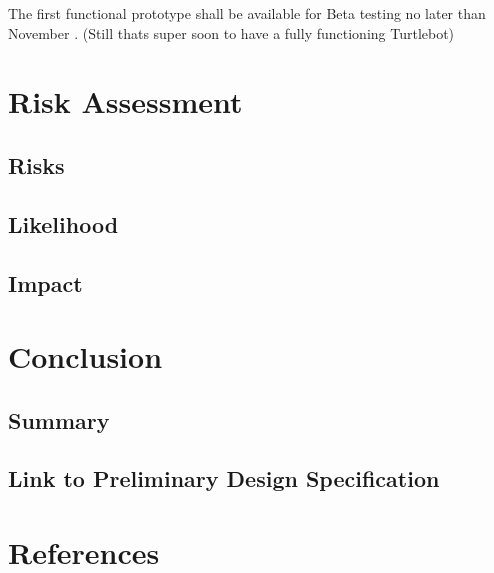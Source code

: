 \documentclass[]{report}
\begin{document}
The first functional prototype shall be available for Beta testing no later than November . (Still thats super soon to have a fully functioning Turtlebot)

\chapter{Risk Assessment}

\section{Risks}

\section{Likelihood}

\section{Impact}

\chapter{Conclusion}

\section{Summary}

\section{Link to Preliminary Design Specification}

\chapter*{References}
\end{document}
